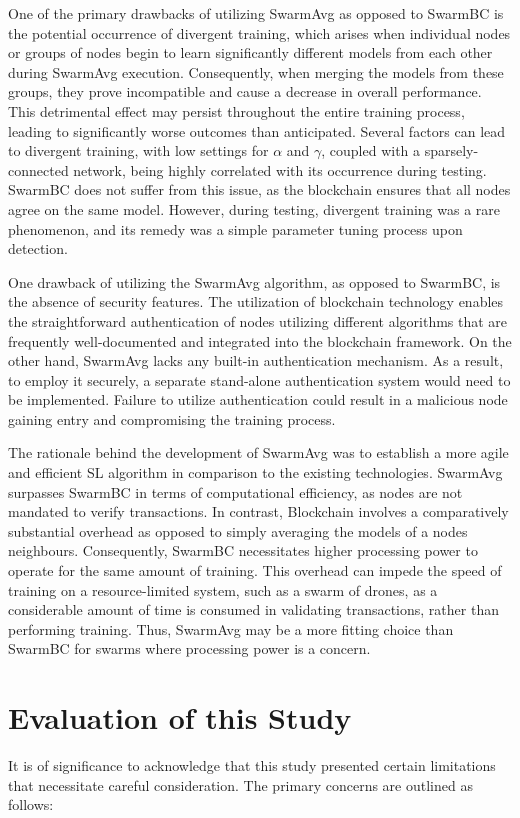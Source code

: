 One of the primary drawbacks of utilizing SwarmAvg as opposed to SwarmBC is the potential occurrence of divergent training, which arises when individual nodes or groups of nodes begin to learn significantly different models from each other during SwarmAvg execution. Consequently, when merging the models from these groups, they prove incompatible and cause a decrease in overall performance. This detrimental effect may persist throughout the entire training process, leading to significantly worse outcomes than anticipated. Several factors can lead to divergent training, with low settings for $\alpha$ and $\gamma$, coupled with a sparsely-connected network, being highly correlated with its occurrence during testing. SwarmBC does not suffer from this issue, as the blockchain ensures that all nodes agree on the same model. However, during testing, divergent training was a rare phenomenon, and its remedy was a simple parameter tuning process upon detection.

One drawback of utilizing the SwarmAvg algorithm, as opposed to SwarmBC, is the absence of security features. The utilization of blockchain technology enables the straightforward authentication of nodes utilizing different algorithms that are frequently well-documented and integrated into the blockchain framework. On the other hand, SwarmAvg lacks any built-in authentication mechanism. As a result, to employ it securely, a separate stand-alone authentication system would need to be implemented. Failure to utilize authentication could result in a malicious node gaining entry and compromising the training process.

The rationale behind the development of SwarmAvg was to establish a more agile and efficient SL algorithm in comparison to the existing technologies. SwarmAvg surpasses SwarmBC in terms of computational efficiency, as nodes are not mandated to verify transactions. In contrast, Blockchain involves a comparatively substantial overhead as opposed to simply averaging the models of a nodes neighbours. Consequently, SwarmBC necessitates higher processing power to operate for the same amount of training. This overhead can impede the speed of training on a resource-limited system, such as a swarm of drones, as a considerable amount of time is consumed in validating transactions, rather than performing training. Thus, SwarmAvg may be a more fitting choice than SwarmBC for swarms where processing power is a concern.

\section{Evaluation of this Study}
It is of significance to acknowledge that this study presented certain limitations that necessitate careful consideration. The primary concerns are outlined as follows:

